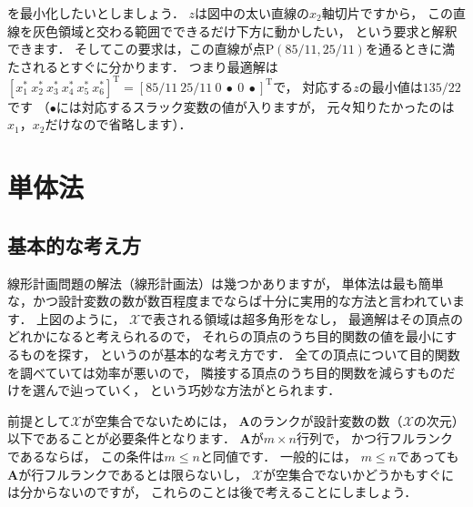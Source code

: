 ﻿\documentclass[a4paper]{jsarticle}
\begin{document}
を最小化したいとしましょう．
$z$は図中の太い直線の$x_{2}$軸切片ですから，
この直線を灰色領域と交わる範囲でできるだけ下方に動かしたい，
という要求と解釈できます．
そしてこの要求は，この直線が点P$(85/11, 25/11)$を通るときに満たされるとすぐに分かります．
つまり最適解は$[x_{1}^{*}~x_{2}^{*}~x_{3}^{*}~x_{4}^{*}~x_{5}^{*}~x_{6}^{*}]^{\mathrm{T}}=[85/11~25/11~0~\bullet~0~\bullet]^{\mathrm{T}}$で，
対応する$z$の最小値は$135/22$です
（$\bullet$には対応するスラック変数の値が入りますが，
元々知りたかったのは$x_{1}$，$x_{2}$だけなので省略します）．

\section{単体法}

\subsection{基本的な考え方}

線形計画問題の解法（線形計画法）は幾つかありますが，
単体法は最も簡単な，かつ設計変数の数が数百程度までならば十分に実用的な方法と言われています．
上図のように，
$\mathcal{X}$で表される領域は超多角形をなし，
最適解はその頂点のどれかになると考えられるので，
それらの頂点のうち目的関数の値を最小にするものを探す，
というのが基本的な考え方です．
全ての頂点について目的関数を調べていては効率が悪いので，
隣接する頂点のうち目的関数を減らすものだけを選んで辿っていく，
という巧妙な方法がとられます．

前提として$\mathcal{X}$が空集合でないためには，
$\boldsymbol{A}$のランクが設計変数の数（$\mathcal{X}$の次元）以下であることが必要条件となります．
$\boldsymbol{A}$が$m\times n$行列で，
かつ行フルランクであるならば，
この条件は$m\leq n$と同値です．
一般的には，
$m\leq n$であっても$\boldsymbol{A}$が行フルランクであるとは限らないし，
$\mathcal{X}$が空集合でないかどうかもすぐには分からないのですが，
これらのことは後で考えることにしましょう．
\end{document}
